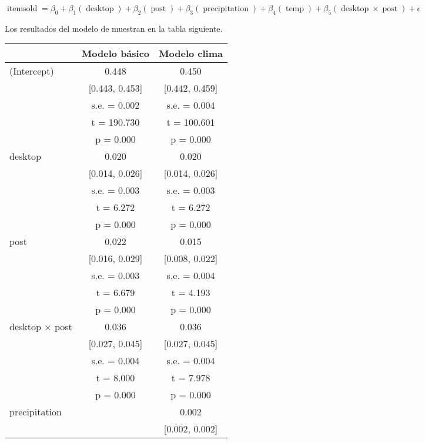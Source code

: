 \documentclass[
  12pt]{article}
\begin{document}
\begin{equation}
\operatorname{itemsold} = \beta_{0} + \beta_{1}(\operatorname{desktop}) + \beta_{2}(\operatorname{post}) + \beta_{3}(\operatorname{precipitation}) + \beta_{4}(\operatorname{temp}) + \beta_{5}(\operatorname{desktop} \times \operatorname{post}) + \epsilon
\end{equation}

Los resultados del modelo de muestran en la tabla siguiente.

\begin{table}[H]
\centering
\begin{tabular}[t]{lcc}
\toprule
  & Modelo básico & Modelo clima\\
\midrule
(Intercept) & \num{0.448} & \num{0.450}\\
 & {}[\num{0.443}, \num{0.453}] & {}[\num{0.442}, \num{0.459}]\\
 & s.e. = \num{0.002} & s.e. = \num{0.004}\\
 & t = \num{190.730} & t = \num{100.601}\\
 & p = \num{0.000} & p = \vphantom{3} \num{0.000}\\
desktop & \num{0.020} & \num{0.020}\\
 & {}[\num{0.014}, \num{0.026}] & {}[\num{0.014}, \num{0.026}]\\
 & s.e. = \num{0.003} & s.e. = \num{0.003}\\
 & t = \num{6.272} & t = \num{6.272}\\
 & p = \num{0.000} & p = \vphantom{2} \num{0.000}\\
post & \num{0.022} & \num{0.015}\\
 & {}[\num{0.016}, \num{0.029}] & {}[\num{0.008}, \num{0.022}]\\
 & s.e. = \num{0.003} & s.e. = \num{0.004}\\
 & t = \num{6.679} & t = \num{4.193}\\
 & p = \num{0.000} & p = \vphantom{1} \num{0.000}\\
desktop × post & \num{0.036} & \num{0.036}\\
 & {}[\num{0.027}, \num{0.045}] & {}[\num{0.027}, \num{0.045}]\\
 & s.e. = \num{0.004} & s.e. = \num{0.004}\\
 & t = \num{8.000} & t = \num{7.978}\\
 & p = \num{0.000} & p = \num{0.000}\\
precipitation &  & \num{0.002}\\
 &  & {}[\num{0.002}, \num{0.002}]\\

\end{tabular}
\end{table}
\end{document}
